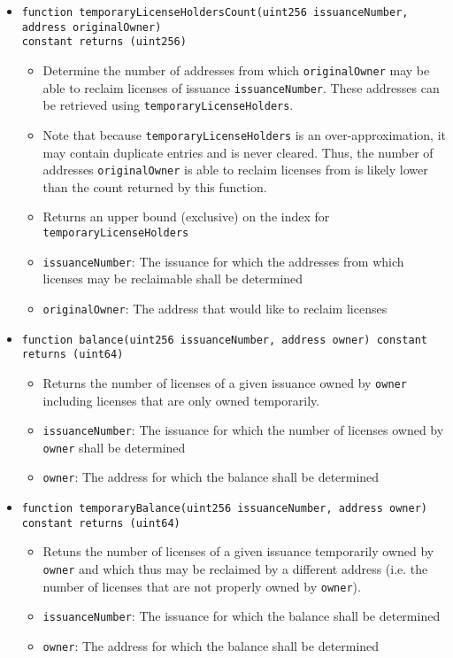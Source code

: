 \documentclass[a4paper]{article}
\begin{document}
\begin{itemize}
  \item \texttt{function temporaryLicenseHoldersCount(uint256 issuanceNumber, address originalOwner) \\constant returns (uint256)}
  \begin{itemize}
    \item Determine the number of addresses from which \texttt{originalOwner} may be able to reclaim licenses of issuance \texttt{issuanceNumber}. These addresses can be retrieved using \texttt{temporaryLicenseHolders}.
    \item Note that because \texttt{temporaryLicenseHolders} is an over-approximation, it may contain duplicate entries and is never cleared. Thus, the number of addresses \texttt{originalOwner} is able to reclaim licenses from is likely lower than the count returned by this function.
    \item Returns an upper bound (exclusive) on the index for \texttt{temporaryLicenseHolders}
    \item \texttt{issuanceNumber}: The issuance for which the addresses from which licenses may be reclaimable shall be determined
    \item \texttt{originalOwner}: The address that would like to reclaim licenses
  \end{itemize}
  
  \item \texttt{function balance(uint256 issuanceNumber, address owner) constant returns (uint64)}
  \begin{itemize}
    \item Returns the number of licenses of a given issuance owned by \texttt{owner} including licenses that are only owned temporarily.
    \item \texttt{issuanceNumber}: The issuance for which the number of licenses owned by \texttt{owner} shall be determined
    \item \texttt{owner}: The address for which the balance shall be determined
  \end{itemize}
  
  \item \texttt{function temporaryBalance(uint256 issuanceNumber, address owner) \\constant returns (uint64)}
  \begin{itemize}
    \item Retuns the number of licenses of a given issuance temporarily owned by \texttt{owner} and which thus may be reclaimed by a different address (i.e. the number of licenses that are not properly owned by \texttt{owner}).
    \item \texttt{issuanceNumber}: The issuance for which the balance shall be determined
    \item \texttt{owner}: The address for which the balance shall be determined
  \end{itemize}
  

\end{itemize}
\end{document}
